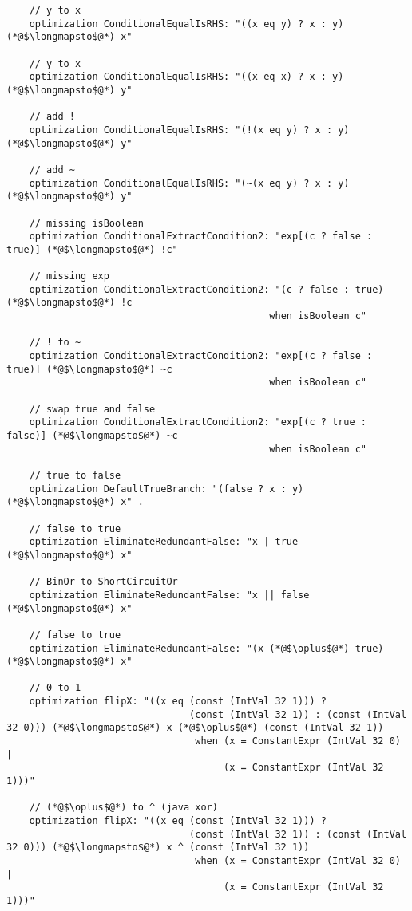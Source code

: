 \begin{appendices}
\begin{lstlisting}
    // y to x
    optimization ConditionalEqualIsRHS: "((x eq y) ? x : y) (*@$\longmapsto$@*) x" 

    // y to x
    optimization ConditionalEqualIsRHS: "((x eq x) ? x : y) (*@$\longmapsto$@*) y" 

    // add !
    optimization ConditionalEqualIsRHS: "(!(x eq y) ? x : y) (*@$\longmapsto$@*) y" 

    // add ~
    optimization ConditionalEqualIsRHS: "(~(x eq y) ? x : y) (*@$\longmapsto$@*) y" 

    // missing isBoolean
    optimization ConditionalExtractCondition2: "exp[(c ? false : true)] (*@$\longmapsto$@*) !c" 

    // missing exp
    optimization ConditionalExtractCondition2: "(c ? false : true) (*@$\longmapsto$@*) !c
                                              when isBoolean c" 

    // ! to ~
    optimization ConditionalExtractCondition2: "exp[(c ? false : true)] (*@$\longmapsto$@*) ~c
                                              when isBoolean c" 

    // swap true and false
    optimization ConditionalExtractCondition2: "exp[(c ? true : false)] (*@$\longmapsto$@*) ~c
                                              when isBoolean c" 
    
    // true to false
    optimization DefaultTrueBranch: "(false ? x : y) (*@$\longmapsto$@*) x" . 
    
    // false to true
    optimization EliminateRedundantFalse: "x | true (*@$\longmapsto$@*) x" 

    // BinOr to ShortCircuitOr
    optimization EliminateRedundantFalse: "x || false (*@$\longmapsto$@*) x" 

    // false to true
    optimization EliminateRedundantFalse: "(x (*@$\oplus$@*) true) (*@$\longmapsto$@*) x" 

    // 0 to 1
    optimization flipX: "((x eq (const (IntVal 32 1))) ? 
                                (const (IntVal 32 1)) : (const (IntVal 32 0))) (*@$\longmapsto$@*) x (*@$\oplus$@*) (const (IntVal 32 1))
                                 when (x = ConstantExpr (IntVal 32 0) | 
                                      (x = ConstantExpr (IntVal 32 1)))" 

    // (*@$\oplus$@*) to ^ (java xor)
    optimization flipX: "((x eq (const (IntVal 32 1))) ? 
                                (const (IntVal 32 1)) : (const (IntVal 32 0))) (*@$\longmapsto$@*) x ^ (const (IntVal 32 1))
                                 when (x = ConstantExpr (IntVal 32 0) | 
                                      (x = ConstantExpr (IntVal 32 1)))" 


\end{lstlisting}
\end{appendices}
